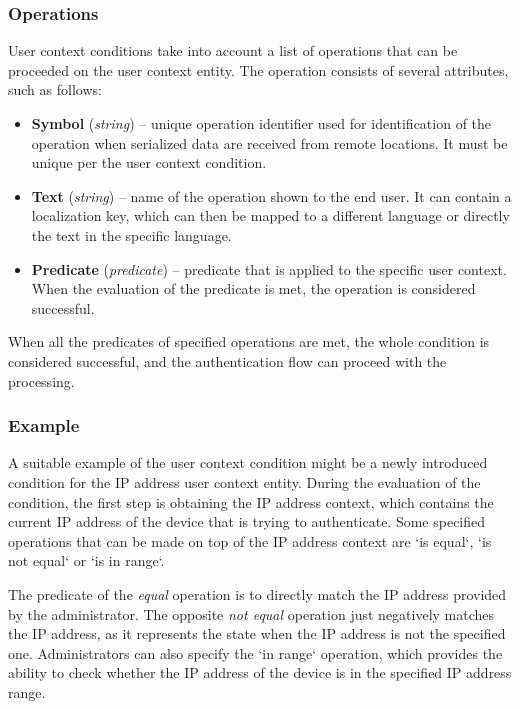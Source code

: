 \subsubsection{Operations} \label{user-context-condition-operations}
User context conditions take into account a list of operations that can be proceeded on the user context entity.
The operation consists of several attributes, such as follows:

\begin{itemize}
    \item \textbf{Symbol} (\textit{string}) -- unique operation identifier used for identification of the operation when serialized data are received from remote locations. It must be unique per the user context condition.
    \item \textbf{Text} (\textit{string}) -- name of the operation shown to the end user.
    It can contain a localization key, which can then be mapped to a different language or directly the text in the specific language. 
    \item \textbf{Predicate} (\textit{predicate}) -- predicate that is applied to the specific user context. When the evaluation of the predicate is met, the operation is considered successful.
\end{itemize}

When all the predicates of specified operations are met, the whole condition is considered successful, and the authentication flow can proceed with the processing.

\subsubsection{Example}

A suitable example of the user context condition might be a newly introduced condition for the IP address user context entity.
During the evaluation of the condition, the first step is obtaining the IP address context, which contains the current IP address of the device that is trying to authenticate.
Some specified operations that can be made on top of the IP address context are `is equal`, `is not equal` or `is in range`.

The predicate of the \textit{equal} operation is to directly match the IP address provided by the administrator.
The opposite \textit{not equal} operation just negatively matches the IP address, as it represents the state when the IP address is not the specified one.
Administrators can also specify the `in range` operation, which provides the ability to check whether the IP address of the device is in the specified IP address range.

